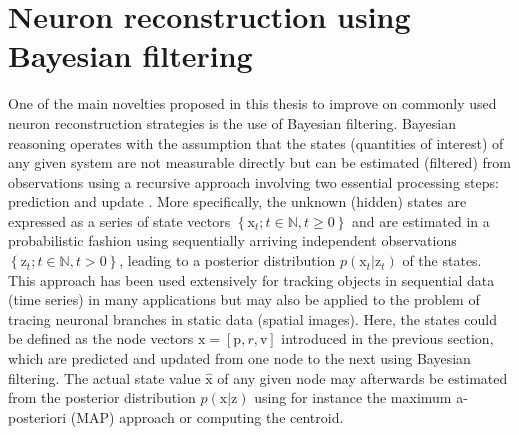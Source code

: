 \section{Neuron reconstruction using Bayesian filtering}
One of the main novelties proposed in this thesis to improve on commonly used neuron reconstruction strategies is the use of Bayesian filtering. Bayesian reasoning operates with the assumption that the states (quantities of interest) of any given system are not measurable directly but can be estimated (filtered) from observations using a recursive approach involving two essential processing steps: prediction and update \cite{doucet2001introduction}. More specifically, the unknown (hidden) states are expressed as a series of state vectors $ \left\lbrace \mathrm{x}_t; t \in \mathbb{N}, t \geq 0 \right\rbrace $ and are estimated in a probabilistic fashion using sequentially arriving independent observations $ \left\lbrace \mathrm{z}_t; t \in \mathbb{N}, t > 0 \right\rbrace $, leading to a  posterior distribution $p(\mathrm{x}_t|\mathrm{z}_t)$ of the states. This approach has been used extensively for tracking objects in sequential data (time series) in many applications \cite{ristic2004beyond, mahler2007statistical, stone2013bayesian, sarkka2013bayesian} but may also be applied to the problem of tracing neuronal branches in static data (spatial images). Here, the states could be defined as the node vectors $\mathrm{x} = \left[ \mathrm{p}, r, \mathrm{v}\right]$ introduced in the previous section, which are predicted and updated from one node to the next using Bayesian filtering. The actual state value $\hat{\mathrm{x}}$ of any given node may afterwards be estimated from the posterior distribution $p(\mathrm{x}|\mathrm{z})$ using for instance the maximum a-posteriori (MAP) approach or computing the centroid.

